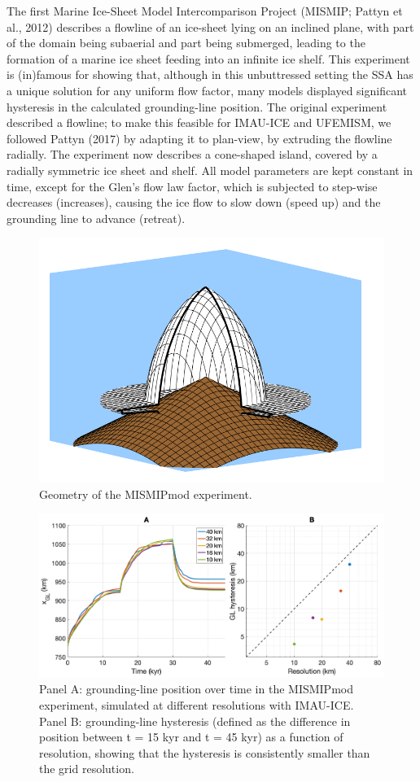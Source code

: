 \documentclass{article}
\begin{document}
The first Marine Ice-Sheet Model Intercomparison Project (MISMIP; Pattyn et al., 2012) describes a flowline of an ice-sheet lying on an inclined plane, with part of the domain being subaerial and part being submerged, leading to the formation of a marine ice sheet feeding into an infinite ice shelf. This experiment is (in)famous for showing that, although in this unbuttressed setting the SSA has a unique solution for any uniform flow factor, many models displayed significant hysteresis in the calculated grounding-line position. The original experiment described a flowline; to make this feasible for IMAU-ICE and UFEMISM, we followed Pattyn (2017) by adapting it to plan-view, by extruding the flowline radially. The experiment now describes a cone-shaped island, covered by a radially symmetric ice sheet and shelf. All model parameters are kept constant in time, except for the Glen's flow law factor, which is subjected to step-wise decreases (increases), causing the ice flow to slow down (speed up) and the grounding line to advance (retreat).

\begin{figure}[H]
  \includegraphics[width=0.6\linewidth]{Fig_benchmark_MISMIP_mod_geometry.png}
  \caption{Geometry of the MISMIP\textunderscore mod experiment.}
\end{figure}

\begin{figure}[H]
  \includegraphics[width=0.75\linewidth]{Fig_benchmark_MISMIP_mod_GL.png}
  \caption{Panel A: grounding-line position over time in the MISMIP\textunderscore mod experiment, simulated at different resolutions with IMAU-ICE. Panel B: grounding-line hysteresis (defined as the difference in position between t = 15 kyr and t = 45 kyr) as a function of resolution, showing that the hysteresis is consistently smaller than the grid resolution.}
\end{figure}
\end{document}
